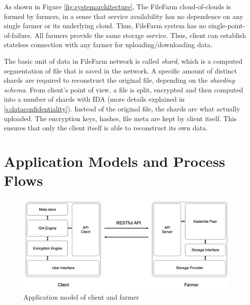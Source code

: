 As shown in Figure \ref{fig:systemarchitecture}, The FileFarm cloud-of-clouds is formed by farmers, in a sense that service availability has no dependence on any single farmer or its underlying cloud. Thus, FileFarm system has no single-point-of-failure. All farmers provide the same storage service. Thus, client can establish stateless connection with any farmer for uploading/downloading data.

The basic unit of data in FileFarm network is called \textit{shard}, which is a computed segmentation of file that is saved in the network. A specific amount of distinct shards are required to reconstruct the original file, depending on the \textit{sharding schema}. From client's point of view, a file is split, encrypted and then computed into a number of shards with IDA (more details explained in \ref{s:dataconfidentiality}). Instead of the original file, the shards are what actually uploaded. The encryption keys, hashes, file meta are kept by client itself. This ensures that only the client itself is able to reconstruct its own data.

\section{Application Models and Process Flows}
\label{s:applicationmodelsandprocessflows}

\begin{figure}[hbt]
\centering
  \includegraphics[width=14cm]{figures/application_models.png}
  \caption{Application model of client and farmer}
  \label{fig:applicationmodels}
\end{figure}

